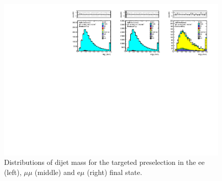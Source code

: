 \clearpage

\begin{figure}[hbt]
  \begin{center}
	\includegraphics[width=1.0\linewidth]{plots/mjj_targeted_19p5.pdf}
	\caption{
	  \label{fig:mjj}\protect 
Distributions of dijet mass for the targeted preselection in the ee (left), $\mu\mu$ (middle) and e$\mu$ (right) final state.
}                   
  \end{center}
\end{figure}




